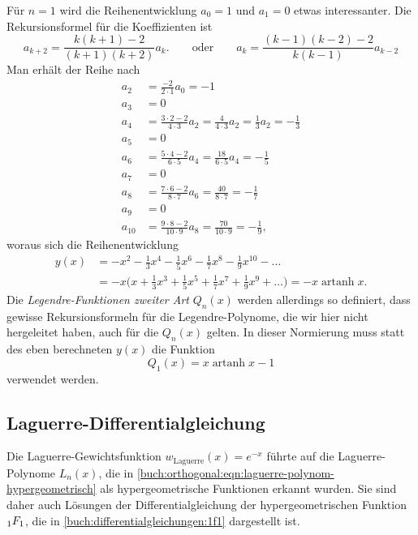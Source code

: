 Für $n=1$ wird die Reihenentwicklung $a_0=1$ und $a_1=0$ etwas
interessanter.
Die Rekursionsformel für die Koeffizienten ist
\[
a_{k+2}
=
\frac{k(k+1)-2}{(k+1)(k+2)} a_k.
\qquad\text{oder}\qquad
a_k
=
\frac{(k-1)(k-2)-2}{k(k-1)}
a_{k-2}
\]
Man erhält der Reihe nach
\begin{align*}
a_2 &= \frac{-2}{2\cdot 1} a_0 = -1
\\
a_3 &= 0
\\
a_4 &= \frac{3\cdot 2-2}{4\cdot 3} a_2 = \frac{4}{4\cdot 3}a_2 = \frac13a_2 = -\frac13
\\
a_5 &= 0
\\
a_6 &= \frac{5\cdot 4-2}{6\cdot 5}a_4 = \frac{18}{6\cdot 5}a_4 = -\frac15
\\
a_7 &= 0
\\
a_8 &= \frac{7\cdot 6-2}{8\cdot 7}a_6 = \frac{40}{8\cdot 7} = -\frac17
\\
a_9 &= 0
\\
a_{10} &= \frac{9\cdot 8-2}{10\cdot 9}a_8 = \frac{70}{10\cdot 9} = -\frac19,
\end{align*}
woraus sich die Reihenentwicklung
\begin{align*}
y(x)
&=
-x^2 -\frac13x^4 -\frac15x^6 - \frac17x^8 -\frac19x^{10}-\dots
\\
&=
-x\biggl(x+\frac13x^3 + \frac15x^5 + \frac17x^7 + \frac19x^9+\dots\biggr)
=
-x\operatorname{artanh}x.
\end{align*}
Die {\em Legendre-Funktionen zweiter Art} $Q_n(x)$  werden allerdings
so definiert, dass gewisse Rekursionsformeln für die Legendre-Polynome,
die wir hier nicht hergeleitet haben, auch für die $Q_n(x)$ gelten.
In dieser Normierung muss statt des eben berechneten $y(x)$ die Funktion
\[
Q_1(x) = x \operatorname{artanh}x-1
\]
verwendet werden.

%
%
\subsection{Laguerre-Differentialgleichung
\label{buch:orthogonal:subsection:laguerre-differentialgleichung}}
Die Laguerre-Gewichtsfunktion $w_{\text{Laguerre}}(x)=e^{-x}$
%
führte auf die Laguerre-Polynome $L_n(x)$, die in 
\eqref{buch:orthogonal:eqn:laguerre-polynom-hypergeometrisch}
als hypergeometrische Funktionen erkannt wurden.
Sie sind daher auch Lösungen der Differentialgleichung
der hypergeometrischen Funktion $\mathstrut_1F_1$, die in
\eqref{buch:differentialgleichungen:1f1} dargestellt ist.


